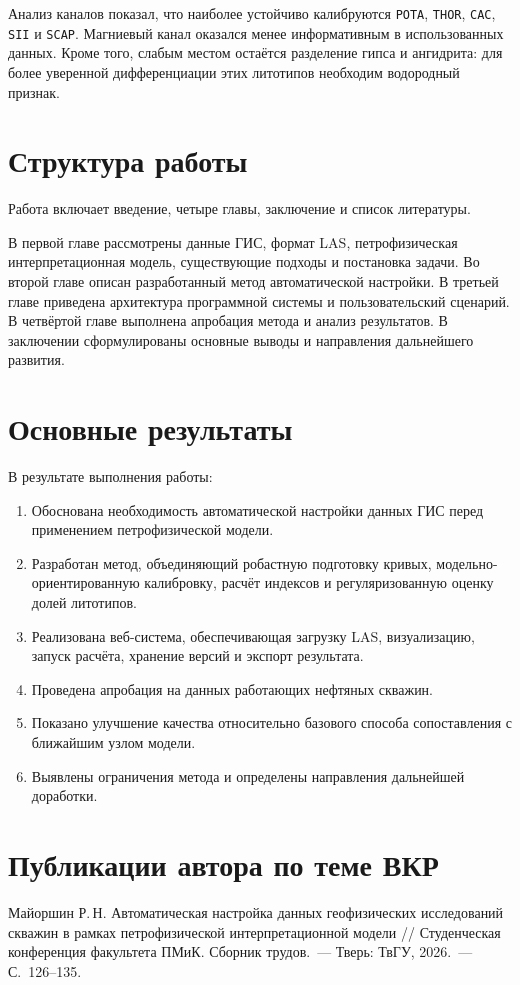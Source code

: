 \documentclass[master,summary]{pmk-graduate}
\begin{document}
Анализ каналов показал, что наиболее устойчиво калибруются \texttt{POTA}, \texttt{THOR}, \texttt{CAC}, \texttt{SII} и \texttt{SCAP}. Магниевый канал оказался менее информативным в использованных данных. Кроме того, слабым местом остаётся разделение гипса и ангидрита: для более уверенной дифференциации этих литотипов необходим водородный признак.

\section{Структура работы}

Работа включает введение, четыре главы, заключение и список литературы.

В первой главе рассмотрены данные ГИС, формат LAS, петрофизическая интерпретационная модель, существующие подходы и постановка задачи. Во второй главе описан разработанный метод автоматической настройки. В третьей главе приведена архитектура программной системы и пользовательский сценарий. В четвёртой главе выполнена апробация метода и анализ результатов. В заключении сформулированы основные выводы и направления дальнейшего развития.

\section{Основные результаты}

В результате выполнения работы:
\begin{enumerate}
    \item Обоснована необходимость автоматической настройки данных ГИС перед применением петрофизической модели.
    \item Разработан метод, объединяющий робастную подготовку кривых, модельно-ориентированную калибровку, расчёт индексов и регуляризованную оценку долей литотипов.
    \item Реализована веб-система, обеспечивающая загрузку LAS, визуализацию, запуск расчёта, хранение версий и экспорт результата.
    \item Проведена апробация на данных работающих нефтяных скважин.
    \item Показано улучшение качества относительно базового способа сопоставления с ближайшим узлом модели.
    \item Выявлены ограничения метода и определены направления дальнейшей доработки.
\end{enumerate}

\section{Публикации автора по теме ВКР}

Майоршин Р.\,Н. Автоматическая настройка данных геофизических исследований скважин в рамках петрофизической интерпретационной модели // Студенческая конференция факультета ПМиК. Сборник трудов.~--- Тверь: ТвГУ, 2026.~--- С.~126--135.
\end{document}
